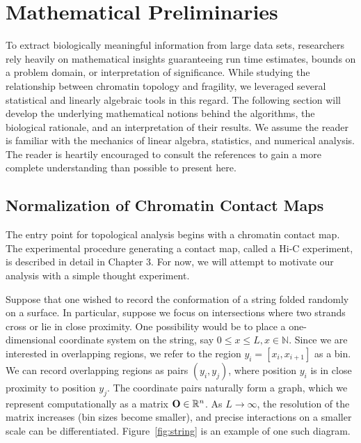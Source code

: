 
\chapter{Mathematical Preliminaries}

To extract biologically meaningful information from large data sets, researchers rely heavily on mathematical insights
guaranteeing run time estimates, bounds on a problem domain, or interpretation of significance.  While studying the relationship
between chromatin topology and fragility, we leveraged several statistical and linearly algebraic tools in this regard.  The following
section will develop the underlying mathematical notions behind the algorithms, the biological rationale, and an interpretation of their
results.  We assume the reader is familiar with the mechanics of linear algebra, statistics, and numerical analysis.  The reader is
heartily encouraged to consult the references to gain a more complete understanding than possible to present here.

\section*{Normalization of Chromatin Contact Maps}

The entry point for topological analysis begins with a chromatin \gls{contact map}.  The experimental procedure generating a contact map,
called a Hi-C experiment, is described in detail in Chapter 3.  For now, we will attempt to motivate our analysis with a simple thought
experiment.

Suppose that one wished to record the conformation of a string folded randomly on a surface.  In particular, suppose we focus on intersections
where two strands cross or lie in close proximity.  One possibility would be to place a one-dimensional coordinate system on the string, say
$0 \leq  x \leq  L, x \in \mathbb{N}$.  Since we are interested in overlapping regions, we refer to the region $y_i = \left[ x_{i}, x_{i+1}\right]$
as a bin.  We can record overlapping regions as pairs $(y_i,y_j)$, where position $y_i$ is in close proximity to position $y_j$.  The
coordinate pairs naturally form a graph, which we represent computationally as a matrix $\mathbf{O} \in \mathbb{R}^n$.  As $L \rightarrow \infty$, the
resolution of the matrix increases (bin sizes become smaller), and precise interactions on a smaller scale can be differentiated.
Figure~\ref{fig:string} is an example of one such diagram.

